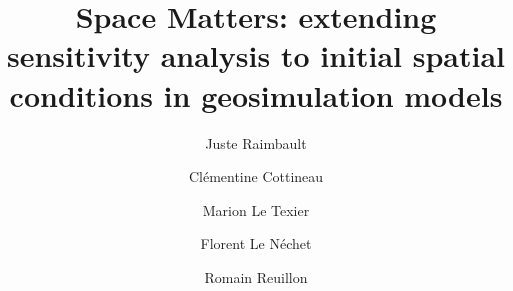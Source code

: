 \documentclass[3p,times,procedia]{elsarticle}
\begin{document}
\begin{frontmatter}

\dochead{}

\title{Space Matters: extending sensitivity analysis to initial spatial conditions in geosimulation models}

\author[a,b]{Juste Raimbault}
\author[c,d]{Cl{\' e}mentine Cottineau}
\author[e]{Marion Le Texier}
\author[f]{Florent Le N{\' e}chet}
\author[a]{Romain Reuillon}

\address[a]{UPS CNRS 3611 ISC-PIF, Paris, France}
\address[b]{UMR CNRS 8504 G{\'e}ographie-cit{\'e}s, Paris, France}
\address[c]{Centre for Advanced Spatial Analysis, University College London, UK}
\address[d]{UMR CNRS 8097 Centre Maurice Halbwachs, Paris, France}
\address[e]{UMR 6266 IDEES, Universit{\'e} de Rouen Normandie, France}
\address[f]{Université Paris-Est, Laboratoire Ville Mobilité Transport, Marne-la-Vallée, France}









\end{frontmatter}
\end{document}
